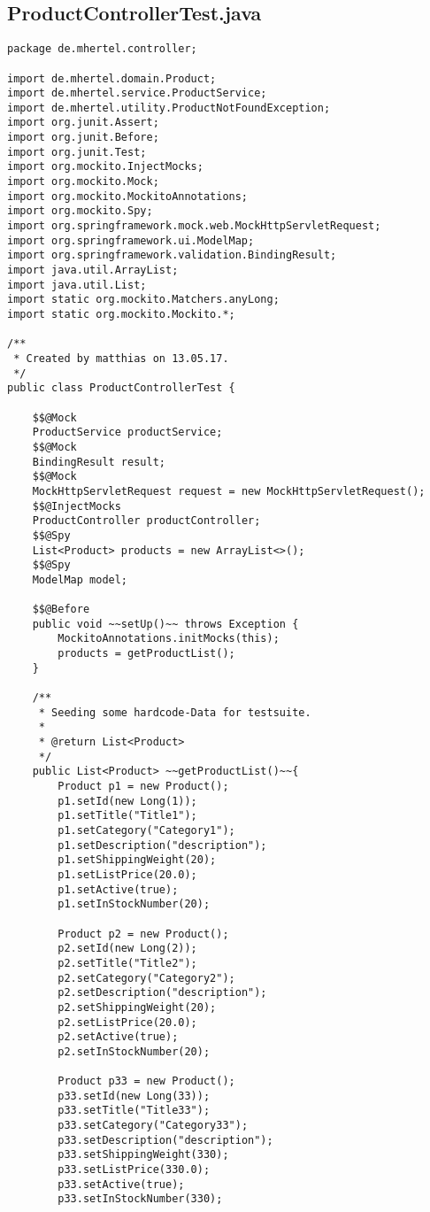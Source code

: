 \documentclass[12pt]{article}
\begin{document}
\subsection{ProductControllerTest.java}

\begin{lstlisting}
package de.mhertel.controller;

import de.mhertel.domain.Product;
import de.mhertel.service.ProductService;
import de.mhertel.utility.ProductNotFoundException;
import org.junit.Assert;
import org.junit.Before;
import org.junit.Test;
import org.mockito.InjectMocks;
import org.mockito.Mock;
import org.mockito.MockitoAnnotations;
import org.mockito.Spy;
import org.springframework.mock.web.MockHttpServletRequest;
import org.springframework.ui.ModelMap;
import org.springframework.validation.BindingResult;
import java.util.ArrayList;
import java.util.List;
import static org.mockito.Matchers.anyLong;
import static org.mockito.Mockito.*;

/**
 * Created by matthias on 13.05.17.
 */
public class ProductControllerTest {

    $$@Mock
    ProductService productService;
    $$@Mock
    BindingResult result;
    $$@Mock
    MockHttpServletRequest request = new MockHttpServletRequest();
    $$@InjectMocks
    ProductController productController;
    $$@Spy
    List<Product> products = new ArrayList<>();
    $$@Spy
    ModelMap model;

    $$@Before
    public void ~~setUp()~~ throws Exception {
        MockitoAnnotations.initMocks(this);
        products = getProductList();
    }

    /**
     * Seeding some hardcode-Data for testsuite.
     *
     * @return List<Product>
     */
    public List<Product> ~~getProductList()~~{
        Product p1 = new Product();
        p1.setId(new Long(1));
        p1.setTitle("Title1");
        p1.setCategory("Category1");
        p1.setDescription("description");
        p1.setShippingWeight(20);
        p1.setListPrice(20.0);
        p1.setActive(true);
        p1.setInStockNumber(20);

        Product p2 = new Product();
        p2.setId(new Long(2));
        p2.setTitle("Title2");
        p2.setCategory("Category2");
        p2.setDescription("description");
        p2.setShippingWeight(20);
        p2.setListPrice(20.0);
        p2.setActive(true);
        p2.setInStockNumber(20);

        Product p33 = new Product();
        p33.setId(new Long(33));
        p33.setTitle("Title33");
        p33.setCategory("Category33");
        p33.setDescription("description");
        p33.setShippingWeight(330);
        p33.setListPrice(330.0);
        p33.setActive(true);
        p33.setInStockNumber(330);


\end{lstlisting}
\end{document}

